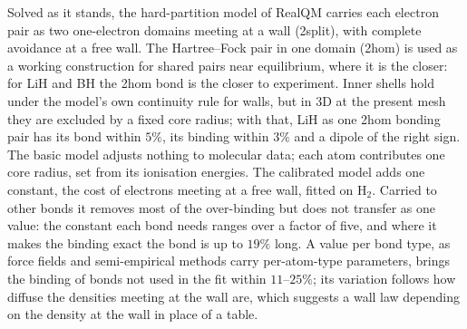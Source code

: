 \documentclass[11pt]{article}
\begin{document}
Solved as it stands, the hard-partition model of RealQM carries each electron pair as two one-electron
domains meeting at a wall (2split), with complete avoidance at a free wall. The Hartree--Fock pair in one
domain (2hom) is used as a working construction for shared pairs near equilibrium, where it is the closer:
for LiH and BH the 2hom bond is the closer to experiment. Inner shells hold under the model's own
continuity rule for walls, but in 3D at the present mesh they are excluded by a fixed core radius; with that, LiH as one 2hom bonding pair has its
bond within $5\%$, its binding within $3\%$ and a dipole of the right sign. The basic model adjusts nothing
to molecular data; each atom contributes one core radius, set from its ionisation energies. The calibrated
model adds one constant, the cost of electrons meeting at a free wall, fitted on H$_2$. Carried to other bonds
it removes most of the over-binding but does not transfer as one value: the constant each bond needs ranges over
a factor of five, and where it makes the binding exact the bond is up to $19\%$ long. A value per bond type, as
force fields and semi-empirical methods carry per-atom-type parameters, brings the binding of bonds not used in
the fit within $11$--$25\%$; its variation follows how diffuse the densities meeting at the wall are, which
suggests a wall law depending on the density at the wall in place of a table.
\end{document}
